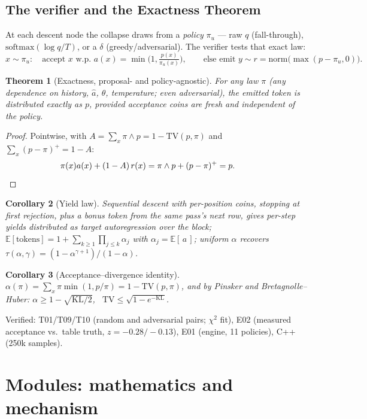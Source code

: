 \documentclass[11pt,a4paper]{article}
\newtheorem{theorem}{Theorem}[section]
\newtheorem{corollary}[theorem]{Corollary}
\theoremstyle{definition}
\begin{document}
\subsection{The verifier and the Exactness Theorem}
\label{sec:exact}
At each descent node the collapse draws from a \emph{policy}
$\pi_u$ --- raw $q$ (fall-through), $\mathrm{softmax}(\log q/T)$,
or a $\delta$ (greedy/adversarial). The verifier tests that exact law:
\begin{equation}
x\sim\pi_u:\quad
\text{accept } x \text{ w.p. } a(x)=\min\!\big(1,\tfrac{p(x)}{\pi_u(x)}\big),
\qquad
\text{else emit } y\sim r=\mathrm{norm}\big(\max(p-\pi_u,0)\big).
\end{equation}
\begin{theorem}[Exactness, proposal- and policy-agnostic]
\label{thm:exact}
For any law $\pi$ (any dependence on history, $\hat a$, $\theta$,
temperature; even adversarial), the emitted token is distributed exactly as
$p$, provided acceptance coins are fresh and independent of the policy.
\end{theorem}
\begin{proof}
Pointwise, with $A=\sum_x \pi\wedge p = 1-\mathrm{TV}(p,\pi)$ and
$\sum_x(p-\pi)^+=1-A$:
\[
\pi(x)a(x)+(1-A)\,r(x)=\pi\wedge p+(p-\pi)^+=p.\qquad\qedhere
\]
\end{proof}
\begin{corollary}[Yield law]
\label{cor:yield}
Sequential descent with per-position coins, stopping at first rejection,
plus a bonus token from the same pass's next row, gives per-step yields
distributed as target autoregression over the block;
$\mathbb E[\text{tokens}]=1+\sum_{k\ge1}\prod_{j\le k}\alpha_j$ with
$\alpha_j=\mathbb E[\,a\,]$; uniform $\alpha$ recovers
$\tau(\alpha,\gamma)=(1-\alpha^{\gamma+1})/(1-\alpha)$.
\end{corollary}
\begin{corollary}[Acceptance--divergence identity]
\label{cor:tv}
$\alpha(\pi)=\sum_x\pi\min(1,p/\pi)=1-\mathrm{TV}(p,\pi)$, and by Pinsker and
Bretagnolle--Huber:
$\alpha\ge 1-\sqrt{\mathrm{KL}/2}$, \
$\mathrm{TV}\le\sqrt{1-e^{-\mathrm{KL}}}$.
\end{corollary}
Verified: T01/T09/T10 (random and adversarial pairs; $\chi^2$ fit), E02
(measured acceptance vs.\ table truth, $z=-0.28/-0.13$), E01 (engine, 11
policies), C++ (250k samples).

\section{Modules: mathematics and mechanism}
\end{document}
